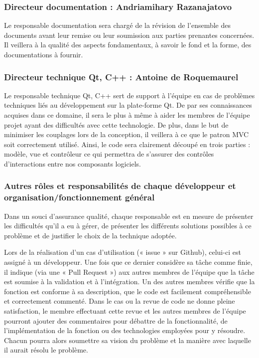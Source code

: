 \subsubsection{Directeur documentation : Andriamihary Razanajatovo}
Le responsable documentation sera chargé de la révision de l'ensemble des documents avant leur remise ou leur soumission aux parties prenantes
concernées. Il veillera à la qualité des aspects fondamentaux, à savoir le fond et la forme, des documentations à fournir.

\subsubsection{Directeur technique Qt, C++ : Antoine de Roquemaurel}
Le responsable technique Qt, C++ sert de support à l'équipe en cas de problèmes techniques liés au développement sur la plate-forme Qt. De par ses
connaissances acquises dans ce domaine, il sera le plus à même à aider les membres de l'équipe projet ayant des difficultés avec cette technologie.
De plus, dans le but de minimiser les couplages lors de la conception, il veillera à ce que le patron MVC soit correctement utilisé. Ainsi, le code
sera clairement découpé en trois parties : modèle, vue et contrôleur ce qui permettra de s’assurer des contrôles d'interactions entre nos composants
logiciels.

\subsubsection{Autres rôles et responsabilités de chaque développeur et organisation/fonctionnement général}
Dans un souci d’assurance qualité, chaque responsable est en mesure de présenter les difficultés qu'il a eu à gérer, de présenter les différents
solutions possibles à ce problème et de justifier le choix de la technique adoptée.

Lors de la réalisation d’un cas d’utilisation (« issue » sur Github), celui-ci est assigné à un développeur. Une fois que ce dernier considère sa
tâche comme finie, il indique (via une « Pull Request ») aux autres membres de l’équipe que la tâche est soumise à la validation et à l'intégration.
Un des autres membres vérifie que la fonction est conforme à sa description, que le code est facilement compréhensible et correctement commenté. Dans
le cas ou la revue de code ne donne pleine satisfaction, le membre effectuant cette revue et les autres membres de l’équipe pourront ajouter des
commentaires pour débattre de la fonctionnalité, de l’implémentation de la fonction ou des technologies employées pour y résoudre. Chacun pourra
alors soumettre sa vision du problème et la manière avec laquelle il aurait résolu le problème. 

